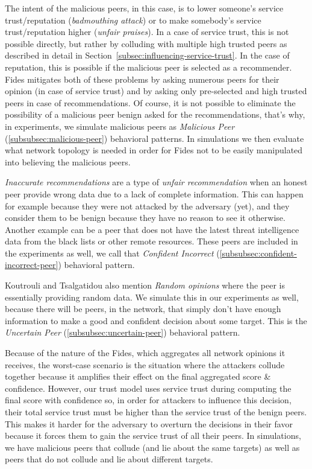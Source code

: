 The intent of the malicious peers, in this case, is to lower someone's service trust/reputation (\textit{badmouthing attack}) or to make somebody's service trust/reputation higher (\textit{unfair praises}).
In a case of service trust, this is not possible directly, but rather by colluding with multiple high trusted peers as described in detail in Section~\ref{subsec:influencing-service-trust}.
In the case of reputation, this is possible if the malicious peer is selected as a recommender.
Fides mitigates both of these problems by asking numerous peers for their opinion (in case of service trust) and by asking only pre-selected and high trusted peers in case of recommendations.
Of course, it is not possible to eliminate the possibility of a malicious peer benign asked for the recommendations, that's why, in experiments, we simulate malicious peers as \textit{Malicious Peer} (\ref{subsubsec:malicious-peer}) behavioral patterns.
In simulations we then evaluate what network topology is needed in order for Fides not to be easily manipulated into believing the malicious peers.

\textit{Inaccurate recommendations} are a type of \textit{unfair recommendation} when an honest peer provide wrong data due to a lack of complete information.
This can happen for example because they were not attacked by the adversary (yet), and they consider them to be benign because they have no reason to see it otherwise.
Another example can be a peer that does not have the latest threat intelligence data from the black lists or other remote resources.
These peers are included in the experiments as well, we call that \textit{Confident Incorrect} (\ref{subsubsec:confident-incorrect-peer}) behavioral pattern.

Koutrouli and Tsalgatidou \cite{KOUTROULI201247} also mention \textit{Random opinions} where the peer is essentially providing random data.
We simulate this in our experiments as well, because there will be peers, in the network, that simply don't have enough information to make a good and confident decision about some target.
This is the \textit{Uncertain Peer} (\ref{subsubsec:uncertain-peer}) behavioral pattern.

Because of the nature of the Fides, which aggregates all network opinions it receives, the worst-case scenario is the situation where the attackers collude together because it amplifies their effect on the final aggregated score \& confidence.
However, our trust model uses service trust during computing the final score with confidence so, in order for attackers to influence this decision, their total service trust must be higher than the service trust of the benign peers.
This makes it harder for the adversary to overturn the decisions in their favor because it forces them to gain the service trust of all their peers.
In simulations, we have malicious peers that collude (and lie about the same targets) as well as peers that do not collude and lie about different targets.

